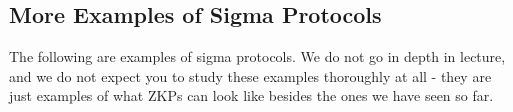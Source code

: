 
 



\subsection{More Examples of Sigma Protocols}

\begin{remark}
The following are examples of sigma protocols. We do not go in depth in lecture, and we do not expect you to study these examples thoroughly at all - they are just examples of what ZKPs can look like besides the ones we have seen so far.
\end{remark}

